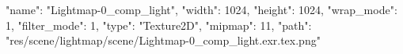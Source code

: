 {
  "name": "Lightmap-0_comp_light",
  "width": 1024,
  "height": 1024,
  "wrap_mode": 1,
  "filter_mode": 1,
  "type": "Texture2D",
  "mipmap": 11,
  "path": "res/scene/lightmap/scene/Lightmap-0_comp_light.exr.tex.png"
}
